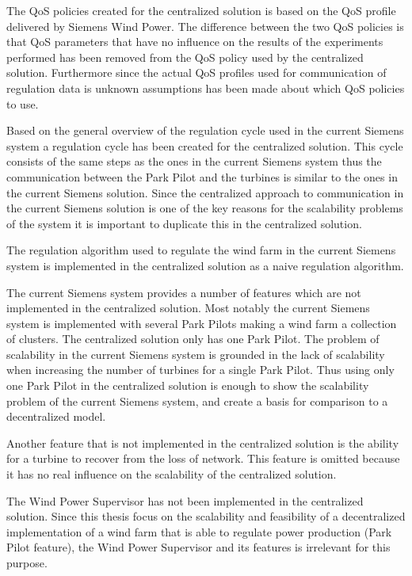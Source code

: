 The QoS policies created for the centralized solution is based on the QoS profile delivered by Siemens Wind Power. The difference between the two QoS policies is that QoS parameters that have no influence on the results of the experiments performed has been removed from the QoS policy used by the centralized solution. Furthermore since the actual QoS profiles used for communication of regulation data is unknown assumptions has been made about which QoS policies to use.

Based on the general overview of the regulation cycle used in the current Siemens system a regulation cycle has been created for the centralized solution. This cycle consists of the same steps as the ones in the current Siemens system thus the communication between the Park Pilot and the turbines is similar to the ones in the current Siemens solution. Since the centralized approach to communication in the current Siemens solution is one of the key reasons for the scalability problems of the system it is important to duplicate this in the centralized solution.

The regulation algorithm used to regulate the wind farm in the current Siemens system is implemented in the centralized solution as a naive regulation algorithm.

The current Siemens system provides a number of features which are not implemented in the centralized solution. Most notably the current Siemens system is implemented with several Park Pilots making a wind farm a collection of clusters. The centralized solution only has one Park Pilot. The problem of scalability in the current Siemens system is grounded in the lack of scalability when increasing the number of turbines for a single Park Pilot. Thus using only one Park Pilot in the centralized solution is enough to show the scalability problem of the current Siemens system, and create a basis for comparison to a decentralized model.

Another feature that is not implemented in the centralized solution is the ability for a turbine to recover from the loss of network. This feature is omitted because it has no real influence on the scalability of the centralized solution.

The Wind Power Supervisor has not been implemented in the centralized solution. Since this thesis focus on the scalability and feasibility of a decentralized implementation of a wind farm that is able to regulate power production (Park Pilot feature), the Wind Power Supervisor and its features is irrelevant for this purpose.